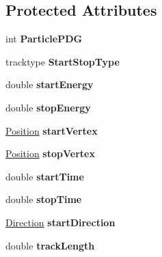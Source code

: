 \subsection*{Protected Attributes}
\begin{DoxyCompactItemize}
\item 
\hypertarget{classParticle_afb1a0b4ded7006e229d0a3c572874696}{
int {\bfseries ParticlePDG}}
\label{classParticle_afb1a0b4ded7006e229d0a3c572874696}

\item 
\hypertarget{classParticle_a2e4d914cad53144592a6b781af9dae0f}{
tracktype {\bfseries StartStopType}}
\label{classParticle_a2e4d914cad53144592a6b781af9dae0f}

\item 
\hypertarget{classParticle_a5423d92a78e23c3dcd26ebfbb690692b}{
double {\bfseries startEnergy}}
\label{classParticle_a5423d92a78e23c3dcd26ebfbb690692b}

\item 
\hypertarget{classParticle_af1ba1bafa350dda9a76c7ac3c7f7755b}{
double {\bfseries stopEnergy}}
\label{classParticle_af1ba1bafa350dda9a76c7ac3c7f7755b}

\item 
\hypertarget{classParticle_a7dfdb772edd79ee66ffcd57b9b87f122}{
\hyperlink{classPosition}{Position} {\bfseries startVertex}}
\label{classParticle_a7dfdb772edd79ee66ffcd57b9b87f122}

\item 
\hypertarget{classParticle_a91ecd35a7caa52c7c8cfb07ef7941332}{
\hyperlink{classPosition}{Position} {\bfseries stopVertex}}
\label{classParticle_a91ecd35a7caa52c7c8cfb07ef7941332}

\item 
\hypertarget{classParticle_a07531fe11b42a3876addaddc60cfba5c}{
double {\bfseries startTime}}
\label{classParticle_a07531fe11b42a3876addaddc60cfba5c}

\item 
\hypertarget{classParticle_a544f4cc1bdb91fdb4abc974fcb2f8fd4}{
double {\bfseries stopTime}}
\label{classParticle_a544f4cc1bdb91fdb4abc974fcb2f8fd4}

\item 
\hypertarget{classParticle_a1c54e0a9a6968eb1ead66e7c5121f264}{
\hyperlink{classDirection}{Direction} {\bfseries startDirection}}
\label{classParticle_a1c54e0a9a6968eb1ead66e7c5121f264}

\item 
\hypertarget{classParticle_ae125283518203a3eb9f85a811a48139b}{
double {\bfseries trackLength}}
\label{classParticle_ae125283518203a3eb9f85a811a48139b}

\end{DoxyCompactItemize}
